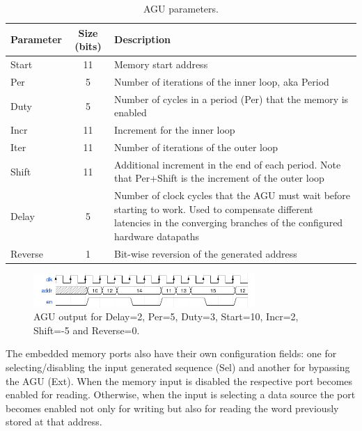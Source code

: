 \begin{table}[!htb]
	\renewcommand{\arraystretch}{1.2} %
	\caption{AGU parameters.}
	\label{tab:agu}
	\centering
	\begin{tabular}{lcp{10cm}}
		\toprule
		Parameter & Size (bits) & Description\\
		\midrule
		Start     &          11 & Memory start address\\
		Per       &           5 & Number of iterations of the inner loop, aka Period\\
		Duty      &           5 & Number of cycles in a period (Per) that the memory is
		enabled\\
		Incr      &          11 & Increment for the inner loop\\
		Iter      &          11 & Number of iterations of the outer loop\\
		Shift     &          11 & Additional increment in the end of each period. Note 
		that
		Per+Shift is the increment of the outer loop\\
		Delay     &           5 & Number of clock cycles that the AGU must wait before 
		starting
		to work. Used to compensate different latencies in the converging branches of the
		configured hardware datapaths\\
		Reverse   &           1 & Bit-wise reversion of the generated address\\
		\bottomrule
	\end{tabular}
\end{table}

\begin{figure}[!htb]
	\centering
	\includegraphics[width=0.75\textwidth]{Figures/addrgen.png}
	\caption{AGU output for Delay=2, Per=5, Duty=3, Start=10, Incr=2, Shift=-5 and 
	Reverse=0.}
	\label{fig:addrgen}
\end{figure}

The embedded memory ports also have their own configuration fields: one for
selecting/disabling the input generated sequence (Sel) and another for bypassing
the \ac{AGU} (Ext). When the memory input is disabled the respective port
becomes enabled for reading. Otherwise, when the input is selecting a data
source the port becomes enabled not only for writing but also for reading the
word previously stored at that address.

